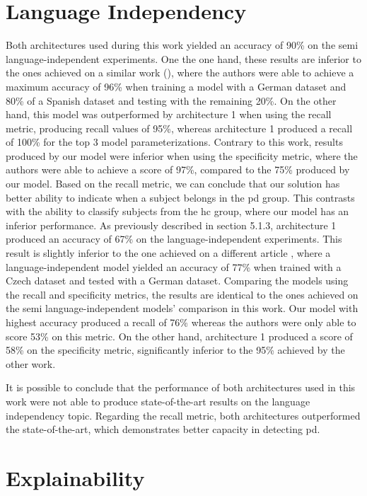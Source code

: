 \section{Language Independency}

Both architectures used during this work yielded an accuracy of 90\% on the semi language-independent experiments. One the one hand, these results are inferior to the ones achieved on a similar work (\cite{parkinson_three_languages}), where the authors were able to achieve a maximum accuracy of 96\% when training a model with a German dataset and 80\% of a Spanish dataset and testing with the remaining 20\%. On the other hand, this model was outperformed by architecture 1 when using the recall metric, producing recall values of 95\%, whereas architecture 1 produced a recall of 100\% for the top 3 model parameterizations. Contrary to this work, results produced by our model were inferior when using the specificity metric, where the authors were able to achieve a score of 97\%, compared to the 75\% produced by our model. Based on the recall metric, we can conclude that our solution has better ability to indicate when a subject belongs in the \gls{pd} group. This contrasts with the ability to classify subjects from the \gls{hc} group, where our model has an inferior performance. As previously described in section 5.1.3, architecture 1 produced an accuracy of 67\% on the language-independent experiments. This result is slightly inferior to the one achieved on a different article \cite{parkinson_three_languages}, where a language-independent model yielded an accuracy of 77\% when trained with a Czech dataset and tested with a German dataset. Comparing the models using the recall and specificity metrics, the results are identical to the ones achieved on the semi language-independent models' comparison in this work. Our model with highest accuracy produced a recall of 76\% whereas the authors were only able to score 53\% on this metric. On the other hand, architecture 1 produced a score of 58\% on the specificity metric, significantly inferior to the 95\% achieved by the other work.

It is possible to conclude that the performance of both architectures used in this work were not able to produce state-of-the-art results on the language independency topic. Regarding the recall metric, both architectures outperformed the state-of-the-art, which demonstrates better capacity in detecting \gls{pd}.

\section{Explainability}

